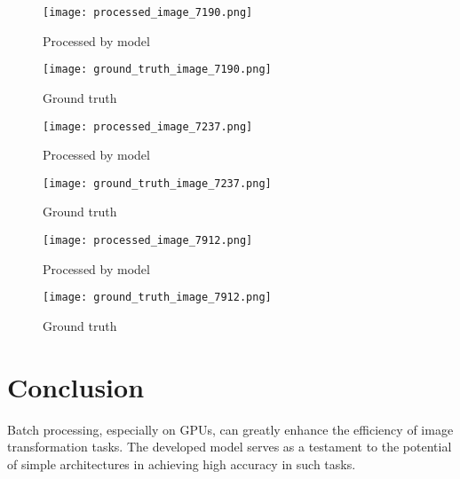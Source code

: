 \documentclass[12pt, a4paper]{article}
\begin{document}
\begin{figure}[ht]
  \centering
  \begin{minipage}[b]{0.45\textwidth}
    \texttt{[image: processed\_image\_7190.png]}
    \caption{Processed by model}
    \label{fig:processed_8}
  \end{minipage}
  \hfill
  \begin{minipage}[b]{0.45\textwidth}
    \texttt{[image: ground\_truth\_image\_7190.png]}
    \caption{Ground truth}
    \label{fig:ground_truth_8}
  \end{minipage}
\end{figure}

\begin{figure}[ht]
  \centering
  \begin{minipage}[b]{0.45\textwidth}
    \texttt{[image: processed\_image\_7237.png]}
    \caption{Processed by model}
    \label{fig:processed_9}
  \end{minipage}
  \hfill
  \begin{minipage}[b]{0.45\textwidth}
    \texttt{[image: ground\_truth\_image\_7237.png]}
    \caption{Ground truth}
    \label{fig:ground_truth_9}
  \end{minipage}
\end{figure}

\begin{figure}[ht]
  \centering
  \begin{minipage}[b]{0.45\textwidth}
    \texttt{[image: processed\_image\_7912.png]}
    \caption{Processed by model}
    \label{fig:processed_10}
  \end{minipage}
  \hfill
  \begin{minipage}[b]{0.45\textwidth}
    \texttt{[image: ground\_truth\_image\_7912.png]}
    \caption{Ground truth}
    \label{fig:ground_truth_10}
  \end{minipage}
\end{figure}

\FloatBarrier %
\section{Conclusion}
Batch processing, especially on GPUs, can greatly enhance the efficiency of image transformation tasks. The developed model serves as a testament to the potential of simple architectures in achieving high accuracy in such tasks.
\end{document}

